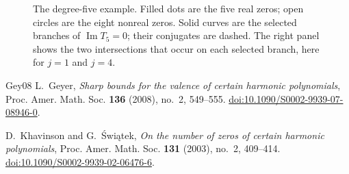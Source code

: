 \documentclass[a4paper]{amsart}
\theoremstyle{remark}
\newcommand{\eps}{\varepsilon}
\DeclareMathOperator{\Ima}{Im}
\begin{document}
\begin{figure}[htbp]
\caption{The degree-five example. Filled dots are the five real zeros;
open circles are the eight nonreal zeros. Solid curves are the selected
branches of \(\Ima T_5=0\); their conjugates are dashed.
The right panel shows the two intersections that occur on each
selected branch, here for \(j=1\) and \(j=4\).}
\label{fig:chebyshev}
\end{figure}


\begin{thebibliography}{Gey08}
L.~Geyer, \emph{Sharp bounds for the valence of certain harmonic polynomials},
Proc. Amer. Math. Soc. \textbf{136} (2008), no.~2, 549--555.
\href{https://doi.org/10.1090/S0002-9939-07-08946-0}{doi:10.1090/S0002-9939-07-08946-0}.

D.~Khavinson and G.~\'{S}wi\k{a}tek,
\emph{On the number of zeros of certain harmonic polynomials},
Proc. Amer. Math. Soc. \textbf{131} (2003), no.~2, 409--414.
\href{https://doi.org/10.1090/S0002-9939-02-06476-6}{doi:10.1090/S0002-9939-02-06476-6}.

\end{thebibliography}
\end{document}
